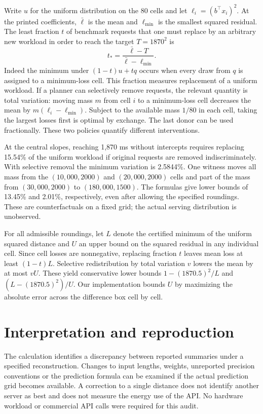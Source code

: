 \documentclass[11pt]{article}
\begin{document}
Write $u$ for the uniform distribution on the 80 cells and let $\ell_i=(b^\top x_i)^2$. At the printed coefficients, $\bar\ell$ is the mean and $\ell_{\min}$ is the smallest squared residual. The least fraction $t$ of benchmark requests that one must replace by an arbitrary new workload in order to reach the target $T=1870^2$ is
\[
 t_*=\frac{\bar\ell-T}{\bar\ell-\ell_{\min}}.
\]
Indeed the minimum under $(1-t)u+tq$ occurs when every draw from $q$ is assigned to a minimum-loss cell. This fraction measures replacement of a uniform workload. If a planner can selectively remove requests, the relevant quantity is total variation: moving mass $m$ from cell $i$ to a minimum-loss cell decreases the mean by $m(\ell_i-\ell_{\min})$. Subject to the available mass $1/80$ in each cell, taking the largest losses first is optimal by exchange. The last donor can be used fractionally. These two policies quantify different interventions.

At the central slopes, reaching 1,870 ms without intercepts requires replacing 15.54\% of the uniform workload if original requests are removed indiscriminately. With selective removal the minimum variation is 2.5844\%. One witness moves all mass from the $(10{,}000,2000)$ and $(20{,}000,2000)$ cells and part of the mass from $(30{,}000,2000)$ to $(180{,}000,1500)$. The formulas give lower bounds of 13.45\% and 2.01\%, respectively, even after allowing the specified roundings. These are counterfactuals on a fixed grid; the actual serving distribution is unobserved.

For all admissible roundings, let $L$ denote the certified minimum of the uniform squared distance and $U$ an upper bound on the squared residual in any individual cell. Since cell losses are nonnegative, replacing fraction $t$ leaves mean loss at least $(1-t)L$. Selective redistribution by total variation $v$ lowers the mean by at most $vU$. These yield conservative lower bounds $1-(1870.5)^2/L$ and $(L-(1870.5)^2)/U$. Our implementation bounds $U$ by maximizing the absolute error across the difference box cell by cell.

\section{Interpretation and reproduction}
The calculation identifies a discrepancy between reported summaries under a specified reconstruction. Changes to input lengths, weights, unreported precision conventions or the prediction formula can be examined if the actual prediction grid becomes available. A correction to a single distance does not identify another server as best and does not measure the energy use of the API. No hardware workload or commercial API calls were required for this audit.
\end{document}
